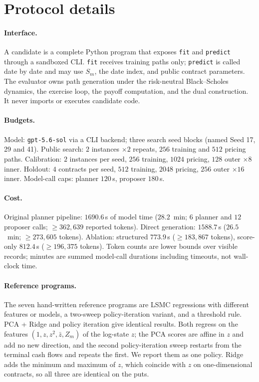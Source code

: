 \documentclass{article}
\begin{document}
\section{Protocol details}
\label{app:protocol}

\paragraph{Interface.}
A candidate is a complete Python program that exposes \texttt{fit} and \texttt{predict} through a sandboxed CLI. \texttt{fit} receives training paths only; \texttt{predict} is called date by date and may use $S_m$, the date index, and public contract parameters. The evaluator owns path generation under the risk-neutral Black--Scholes dynamics, the exercise loop, the payoff computation, and the dual construction. It never imports or executes candidate code.

\paragraph{Budgets.}
Model: \texttt{gpt-5.6-sol} via a CLI backend; three search seed blocks (named Seed 17, 29 and 41). Public search: $2$ instances $\times 2$ repeats, $256$ training and $512$ pricing paths. Calibration: $2$ instances per seed, $256$ training, $1024$ pricing, $128$ outer $\times 8$ inner. Holdout: $4$ contracts per seed, $512$ training, $2048$ pricing, $256$ outer $\times 16$ inner. Model-call caps: planner $120$\,s, proposer $180$\,s.

\paragraph{Cost.}
Original planner pipeline: $1690.6$\,s of model time ($28.2$~min; $6$ planner and $12$ proposer calls; $\ge 362{,}639$ reported tokens). Direct generation: $1588.7$\,s ($26.5$~min; $\ge 273{,}605$ tokens). Ablation: structured $773.9$\,s ($\ge 183{,}867$ tokens), score-only $812.4$\,s ($\ge 196{,}375$ tokens). Token counts are lower bounds over visible records; minutes are summed model-call durations including timeouts, not wall-clock time.

\paragraph{Reference programs.}
The seven hand-written reference programs are LSMC regressions with different features or models, a two-sweep policy-iteration variant, and a threshold rule. PCA + Ridge and policy iteration give identical results. Both regress on the features $(1, z, z^2, \bar z, Z_m)$ of the log-state $z$; the PCA scores are affine in $z$ and add no new direction, and the second policy-iteration sweep restarts from the terminal cash flows and repeats the first. We report them as one policy. Ridge adds the minimum and maximum of $z$, which coincide with $z$ on one-dimensional contracts, so all three are identical on the puts.
\end{document}
